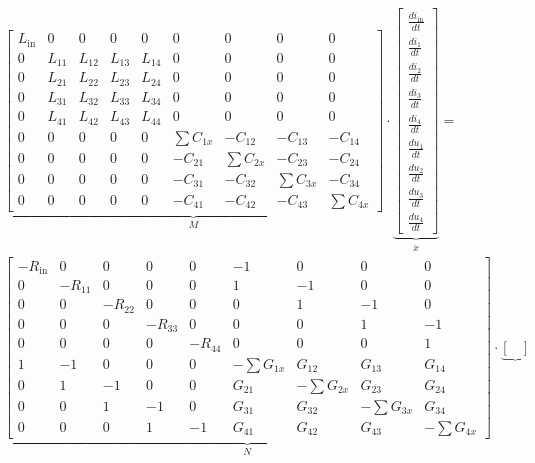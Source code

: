 \begin{refsection}
{\footnotesize 
\begin{align}
			&
			\underbrace{\begin{bmatrix}
			L_\mathrm{in}&0&0&0&0 & 0&0&0&0 \\
			0&L_{11}&L_{12}&L_{13}&L_{14} & 0&0&0&0 \\
			0&L_{21}&L_{22}&L_{23}&L_{24} & 0&0&0&0 \\
			0&L_{31}&L_{32}&L_{33}&L_{34} & 0&0&0&0 \\
			0&L_{41}&L_{42}&L_{43}&L_{44} & 0&0&0&0 \\
			0&0&0&0&0 & \sum{C_{1x}}&-C_{12}&-C_{13}&-C_{14} \\
			0&0&0&0&0 & -C_{21}&\sum{C_{2x}}&-C_{23}&-C_{24} \\
			0&0&0&0&0 & -C_{31}&-C_{32}&\sum{C_{3x}}&-C_{34} \\
			0&0&0&0&0 & -C_{41}&-C_{42}&-C_{43}&\sum{C_{4x}}
			    \end{bmatrix}}_{\text{$M$}}
			\cdot
			\underbrace{\begin{bmatrix}
			\frac{di_\mathrm{in}}{dt} \\
			\frac{di_1}{dt} \\
			\frac{di_2}{dt} \\
			\frac{di_3}{dt} \\
			\frac{di_4}{dt} \\
			\frac{du_1}{dt} \\
			\frac{du_2}{dt} \\
			\frac{du_3}{dt} \\
			\frac{du_4}{dt}
			\end{bmatrix}}_{\text{$\dot{x}$}}
			= \nonumber \\
			&
			\underbrace{\begin{bmatrix}
			-R_\mathrm{in}&0&0&0&0 & -1&0&0&0 \\
			0&-R_{11}&0&0&0 & 1&-1&0&0 \\
			0&0&-R_{22}&0&0 & 0&1&-1&0 \\
			0&0&0&-R_{33}&0 & 0&0&1&-1 \\
			0&0&0&0&-R_{44} & 0&0&0&1 \\
			1&-1&0&0&0 & -\sum G_{1x}&G_{12}&G_{13}&G_{14} \\
			0&1&-1&0&0 & G_{21} &- \sum G_{2x}& G_{23}& G_{24} \\
			0&0&1&-1&0 & G_{31} & G_{32} &-\sum G_{3x}&G_{34} \\
			0&0&0&1&-1 & G_{41}&G_{42}&G_{43}&-\sum G_{4x}
			\end{bmatrix}}_{\text{$N$}}
			\cdot
			\underbrace{\begin{bmatrix}

\end{bmatrix}}
\end{align}}
\end{refsection}
